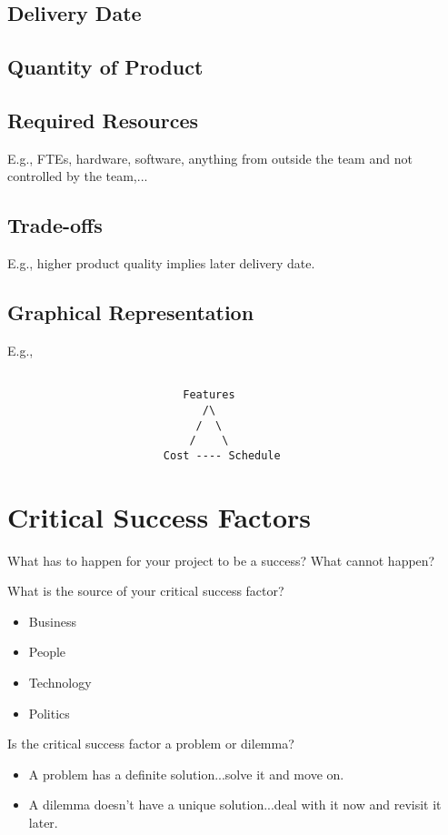 \documentclass[11pt]{nmemo}
\begin{document}
\subsection*{Delivery Date}

\subsection*{Quantity of Product}

\subsection*{Required Resources}
             E.g., FTEs, hardware, software, anything from outside the
             team and not controlled by the team,...

\subsection*{Trade-offs}
             E.g., higher product quality implies later delivery date.

\subsection*{Graphical Representation}
             E.g.,   
             \begin{verbatim}

                           Features
                              /\
                             /  \
                            /    \
                        Cost ---- Schedule

              \end{verbatim}


\newpage
\section*{Critical Success Factors}

What has to happen for your project to be a success?  What cannot
happen?

What is the source of your critical success factor?
\begin{itemize}
  \item Business
  \item People
  \item Technology
  \item Politics
\end{itemize}

Is the critical success factor a problem or dilemma?
\begin{itemize}
  \item A problem has a definite solution...solve it and move on.
  \item A dilemma doesn't have a unique solution...deal with it now
        and revisit it later.
\end{itemize}
\end{document}
